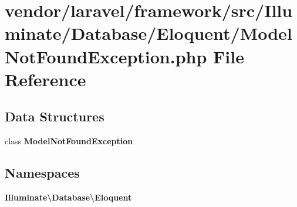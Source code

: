 \section{vendor/laravel/framework/src/\+Illuminate/\+Database/\+Eloquent/\+Model\+Not\+Found\+Exception.php File Reference}
\label{_model_not_found_exception_8php}
\subsection*{Data Structures}
\begin{DoxyCompactItemize}
\item 
class {\bf Model\+Not\+Found\+Exception}
\end{DoxyCompactItemize}
\subsection*{Namespaces}
\begin{DoxyCompactItemize}
\item 
 {\bf Illuminate\textbackslash{}\+Database\textbackslash{}\+Eloquent}
\end{DoxyCompactItemize}

